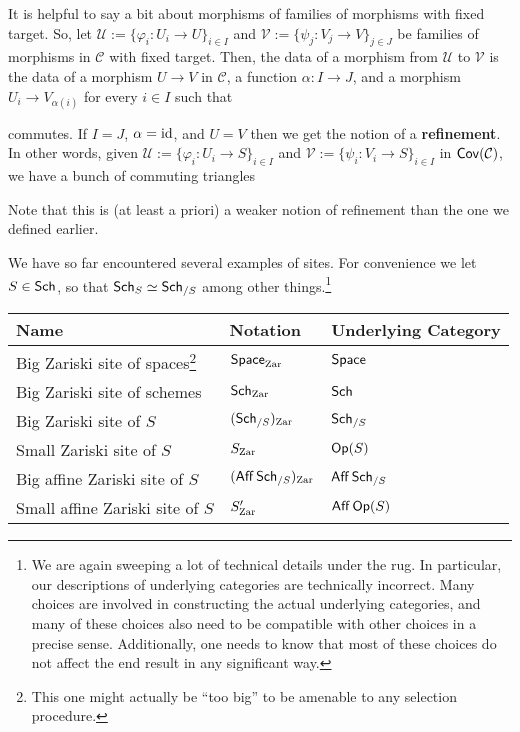 \documentclass[11pt]{article}
\newcommand{\CC}{\mathcal{C}}
\renewcommand{\phi}{\varphi}
\newcommand{\U}{\mathscr{U}}
\newcommand{\V}{\mathscr{V}}
\begin{document}
\begin{remark}
It is helpful to say a bit about morphisms of families of morphisms with fixed target. So, let $\U:=\{\phi_i: U_i\to U\}_{i\in I}$ and $\V:=\{\psi_j: V_j\to V\}_{j\in J}$ be families of morphisms in $\CC$ with fixed target. Then, the data of a morphism from $\U$ to $\V$ is the data of a morphism $U\to V$ in $\CC$, a function $\alpha: I\to J$, and a morphism $U_i\to V_{\alpha(i)}$ for every $i\in I$ such that 
\begin{center}
\end{center}
commutes. If $I=J$, $\alpha=\operatorname{id}$, and $U=V$ then we get the notion of a \textbf{refinement}. In other words, given $\U:=\{\phi_i: U_i\to S\}_{i\in I}$ and $\V:=\{\psi_i: V_i\to S\}_{i\in I}$ in $\Cov(\CC)$, we have a bunch of commuting triangles
\begin{center}
\end{center}
Note that this is (at least a priori) a weaker notion of refinement than the one we defined earlier.
\end{remark}

We have so far encountered several examples of sites. For convenience we let $S\in\operatorname{\mathsf{Sch}}$, so that $\operatorname{\mathsf{Sch}}_S\simeq\operatorname{\mathsf{Sch}}_{/S}$ among other things.\footnote{We are again sweeping a lot of technical details under the rug. In particular, our descriptions of underlying categories are technically incorrect. Many choices are involved in constructing the actual underlying categories, and many of these choices also need to be compatible with other choices in a precise sense. Additionally, one needs to know that most of these choices do not affect the end result in any significant way.}

\begin{center}
\begin{tabular}{|l|l|l|}
\hline
Name & Notation & Underlying Category \\
\hline
Big Zariski site of spaces\footnote{This one might actually be ``too big'' to be amenable to any selection procedure.} & $\operatorname{\mathsf{Space}}_{\operatorname{Zar}}$ & $\operatorname{\mathsf{Space}}$ \\
Big Zariski site of schemes & $\operatorname{\mathsf{Sch}}_{\operatorname{Zar}}$ & $\operatorname{\mathsf{Sch}}$ \\
Big Zariski site of $S$ & $(\operatorname{\mathsf{Sch}}_{/S})_{\operatorname{Zar}}$ & $\operatorname{\mathsf{Sch}}_{/S}$ \\
Small Zariski site of $S$ & $S_{\operatorname{Zar}}$ & $\operatorname{\mathsf{Op}}(S)$ \\
Big affine Zariski site of $S$ & $(\operatorname{\mathsf{Aff}}\operatorname{\mathsf{Sch}}_{/S})_{\operatorname{Zar}}$ & $\operatorname{\mathsf{Aff}}\operatorname{\mathsf{Sch}}_{/S}$ \\
Small affine Zariski site of $S$ & $S_{\operatorname{Zar}}'$ & $\operatorname{\mathsf{Aff}}\operatorname{\mathsf{Op}}(S)$ \\
\hline
\end{tabular}
\end{center}
\end{document}
